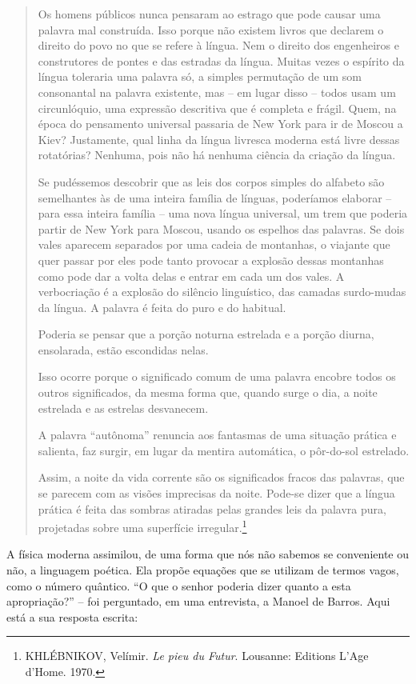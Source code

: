 \begin{quote}
Os homens públicos nunca pensaram ao estrago que pode causar uma palavra
mal construída. Isso porque não existem livros que declarem o direito do
povo no que se refere à língua. Nem o direito dos engenheiros e
construtores de pontes e das estradas da língua. Muitas vezes o espírito
da língua toleraria uma palavra só, a simples permutação de um som
consonantal na palavra existente, mas -- em lugar disso -- todos usam um
circunlóquio, uma expressão descritiva que é completa e frágil. Quem, na
época do pensamento universal passaria de New York para ir de Moscou a
Kiev? Justamente, qual linha da língua livresca moderna está livre
dessas rotatórias? Nenhuma, pois não há nenhuma ciência da criação da
língua.

Se pudéssemos descobrir que as leis dos corpos simples do alfabeto são
semelhantes às de uma inteira família de línguas, poderíamos elaborar --
para essa inteira família -- uma nova língua universal, um trem que
poderia partir de New York para Moscou, usando os espelhos das palavras.
Se dois vales aparecem separados por uma cadeia de montanhas, o viajante
que quer passar por eles pode tanto provocar a explosão dessas montanhas
como pode dar a volta delas e entrar em cada um dos vales. A
verbocriação é a explosão do silêncio linguístico, das camadas
surdo-mudas da língua. A palavra é feita do puro e do habitual.

Poderia se pensar que a porção noturna estrelada e a porção diurna,
ensolarada, estão escondidas nelas.

Isso ocorre porque o significado comum de uma palavra encobre todos os
outros significados, da mesma forma que, quando surge o dia, a noite
estrelada e as estrelas desvanecem.

A palavra ``autônoma'' renuncia aos fantasmas de uma situação prática e
salienta, faz surgir, em lugar da mentira automática, o pôr-do-sol
estrelado.

Assim, a noite da vida corrente são os significados fracos das palavras,
que se parecem com as visões imprecisas da noite. Pode-se dizer que a
língua prática é feita das sombras atiradas pelas grandes leis da
palavra pura, projetadas sobre uma superfície irregular.\footnote{KHLÉBNIKOV,
  Velímir. \emph{Le pieu du Futur}. Lousanne: Editions L'Age d'Home.
  1970.}
\end{quote}

A física moderna assimilou, de uma forma que nós não sabemos se
conveniente ou não, a linguagem poética. Ela propõe equações que se
utilizam de termos vagos, como o número quântico. ``O que o senhor
poderia dizer quanto a esta apropriação?'' -- foi perguntado, em uma
entrevista, a Manoel de Barros. Aqui está a sua resposta escrita:

